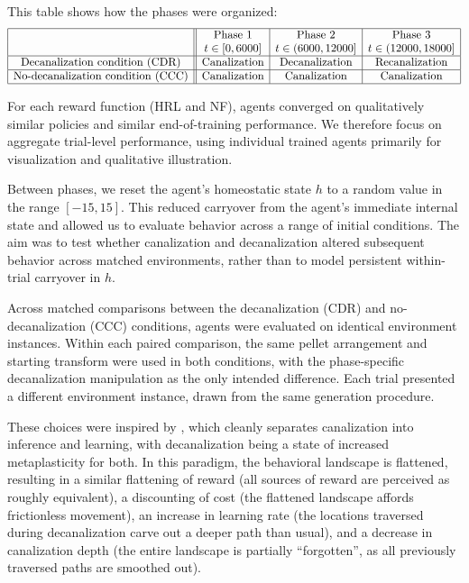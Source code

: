 This table shows how the phases were organized:
{\scriptsize
\[
    \begin{array}{|c||c|c|c|}
        \hline
         & \text{Phase 1}        & \text{Phase 2}   & \text{Phase 3}    \\
         & t\in[0,6000]          & t\in(6000,12000] & t\in(12000,18000] \\
        \hline
        \text{Decanalization condition (CDR)}
         & \text{Canalization}
         & \text{Decanalization}
         & \text{Recanalization}                                        \\
        \hline
        \text{No-decanalization condition (CCC)}
         & \text{Canalization}
         & \text{Canalization}
         & \text{Canalization}                                          \\
        \hline
    \end{array}
\]
}

For each reward function (HRL and NF), agents converged on qualitatively similar policies and similar end-of-training performance. We therefore focus on aggregate trial-level performance, using individual trained agents primarily for visualization and qualitative illustration.

Between phases, we reset the agent's homeostatic state \(h\) to a random value in the range \([-15,15]\). This reduced carryover from the agent's immediate internal state and allowed us to evaluate behavior across a range of initial conditions. The aim was to test whether canalization and decanalization altered subsequent behavior across matched environments, rather than to model persistent within-trial carryover in \(h\).

Across matched comparisons between the decanalization (CDR) and no-decanalization (CCC) conditions, agents were evaluated on identical environment instances. Within each paired comparison, the same pellet arrangement and starting transform were used in both conditions, with the phase-specific decanalization manipulation as the only intended difference. Each trial presented a different environment instance, drawn from the same generation procedure.

These choices were inspired by \cite{juliani_deep_2024}, which cleanly separates canalization into inference and learning, with decanalization being a state of increased metaplasticity for both. In this paradigm, the behavioral landscape is flattened, resulting in a similar flattening of reward (all sources of reward are perceived as roughly equivalent), a discounting of cost (the flattened landscape affords frictionless movement), an increase in learning rate (the locations traversed during decanalization carve out a deeper path than usual), and a decrease in canalization depth (the entire landscape is partially “forgotten”, as all previously traversed paths are smoothed out).

